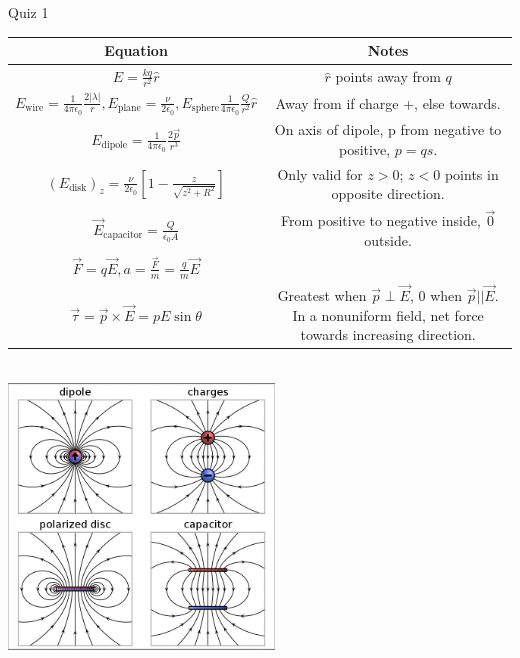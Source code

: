 \documentclass{article}
\begin{document}
\begin{section}{Quiz 1}
 \begin{tabular}{|c|c|}
	 \hline Equation                                                                              & Notes                                                                     \\
	 \hline
	 $E = \frac{kq}{r^2} \hat r$                                                                  & $\hat r$ points away from $q$                                             \\
	 $E_\text{wire} = \frac{1}{4 \pi \epsilon_0} \frac{2 | \lambda |}{r},
		 E_\text{plane} = \frac{\nu}{2 \epsilon_0},

	 E_\text{sphere} \frac{1}{4 \pi \epsilon_0} \frac{Q}{r^2} \hat r $                            & Away from if charge +, else towards.                                      \\

	 $E_\text{dipole} = \frac{1}{4 \pi \epsilon_0} \frac{2 \vec p}{r^3}$                          & On axis of dipole, p from negative to positive, $p = qs$.                 \\

	 $(E_\text{disk})_z = \frac{\nu}{2 \epsilon_0} \left[ 1 - \frac{z}{\sqrt{z^2 + R^2}} \right]$ & Only valid for $z > 0$; $z < 0$ points in opposite direction.             \\

	 $\vec E_\text{capacitor} = \frac{Q}{\epsilon_0 A}$                                           & From positive to negative inside, $\vec 0$ outside.                       \\


	 $\vec F = q \vec E, a = \frac{ \vec F}{m} = \frac{q}{m} \vec E$                              &                                                                           \\

	 $\vec \tau = \vec p \times \vec E = pE \sin \theta $                                         & \makecell{Greatest when $\vec p \perp \vec E$, 0 when $\vec p || \vec E$. \\ In a nonuniform field, net force towards increasing direction.} \\

	 \hline
 \end{tabular}
 \\
 \includegraphics[width=200pt]{final_cheet_sheet_resources/wsqwwfonwjqrkuiumpdthpngngyqovlq.jpg}
\end{section}
\end{document}
